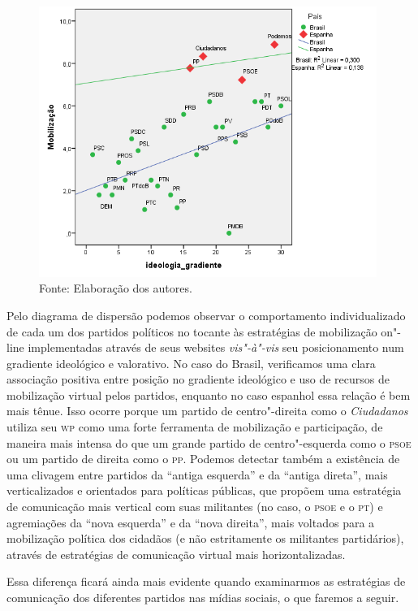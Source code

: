 \begin{figure}[!ht]
\centering
 \includegraphics[width=110mm]{./imgs/graf3.png}
\caption{Fonte: Elaboração dos autores.}
\end{figure}

Pelo diagrama de dispersão podemos observar o comportamento
individualizado de cada um dos partidos políticos no tocante às
estratégias de mobilização on"-line implementadas através de seus
websites \emph{vis"-à"-vis} seu posicionamento num gradiente ideológico e
valorativo. No caso do Brasil, verificamos uma clara associação positiva
entre posição no gradiente ideológico e uso de recursos de mobilização
virtual pelos partidos, enquanto no caso espanhol essa relação é bem
mais tênue. Isso ocorre porque um partido de centro"-direita como o
\emph{Ciudadanos} utiliza seu \textsc{wp} como uma forte ferramenta de
mobilização e participação, de maneira mais intensa do que um grande
partido de centro"-esquerda como o \textsc{psoe} ou um partido de direita como o
\textsc{pp}. Podemos detectar também a existência de uma clivagem entre partidos
da ``antiga esquerda'' e da ``antiga direta'', mais verticalizados e
orientados para políticas públicas, que propõem uma estratégia de
comunicação mais vertical com suas militantes (no caso, o \textsc{psoe} e o \textsc{pt}) e
agremiações da ``nova esquerda'' e da ``nova direita'', mais voltados
para a mobilização política dos cidadãos (e não estritamente os
militantes partidários), através de estratégias de comunicação virtual
mais horizontalizadas.

Essa diferença ficará ainda mais evidente quando examinarmos as
estratégias de comunicação dos diferentes partidos nas mídias sociais, o
que faremos a seguir.

